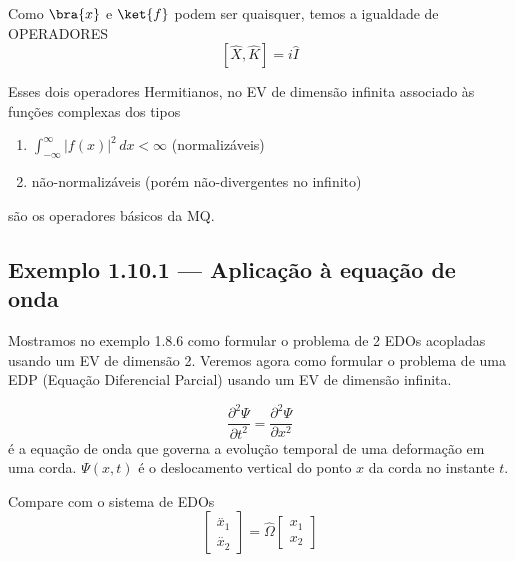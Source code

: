 Como $\bra{x}$ e $\ket{f}$ podem ser quaisquer, temos a igualdade de OPERADORES
\begin{equation}
\boxed{[\hat{X},\hat{K}] = i\hat{I}}
\label{eq:aula7_comutador}
\end{equation}

Esses dois operadores Hermitianos, no EV de dimensão infinita associado às funções complexas dos tipos
\begin{enumerate}
\item[(i)] $\displaystyle\int_{-\infty}^{\infty}|f(x)|^2\,dx < \infty$ \quad (normalizáveis)
\item[(ii)] não-normalizáveis (porém não-divergentes no infinito)
\end{enumerate}
são os operadores básicos da MQ.

\subsection*{Exemplo 1.10.1 --- Aplicação à equação de onda}

Mostramos no exemplo 1.8.6 como formular o problema de 2 EDOs acopladas usando um EV de dimensão 2. Veremos agora como formular o problema de uma EDP (Equação Diferencial Parcial) usando um EV de dimensão infinita.

\begin{equation}
\frac{\partial^2 \Psi}{\partial t^2} = \frac{\partial^2 \Psi}{\partial x^2}
\label{eq:aula7_eq_onda}
\end{equation}
é a equação de onda que governa a evolução temporal de uma deformação em uma corda. $\Psi(x,t)$ é o deslocamento vertical do ponto $x$ da corda no instante $t$.

\begin{center}
\end{center}

Compare com o sistema de EDOs
\begin{equation}
\begin{bmatrix} \overset{..}{x}_1 \\ \overset{..}{x}_2 \end{bmatrix}
= \hat{\Omega} \begin{bmatrix} x_1 \\ x_2 \end{bmatrix}
\label{eq:aula7_sistema_edo}
\end{equation}

